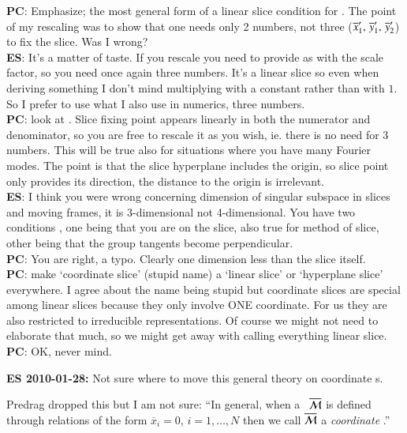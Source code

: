     {\bf PC}: Emphasize; the most general form of a linear slice condition for
    \cLe. The point of my rescaling was to show that one needs only 2 numbers,
    not three (${\overline{x}'_{1}},\,{\overline{y}'_{1}},\,{\overline{y}'_{2}}$)
    to fix the slice. Was I wrong?
    \\
    {\bf ES}: It's a matter of taste. If you rescale
    you need to provide as with the scale factor, so you need once again three numbers.
    It's a linear slice so even when deriving something I don't mind multiplying with
    a constant rather than with $1$. So I prefer to use what I also use in numerics,
    three numbers.
    \\
    {\bf PC}: look at . Slice fixing point
    appears linearly in both the numerator and denominator,
    so you are free to rescale it as you wish, ie. there is
    no need for 3 numbers. This will be true also for situations where
    you have many Fourier modes. The point is that the slice
    hyperplane includes the origin, so slice point only
    provides its direction, the distance to the origin is
    irrelevant.
    \\
    {\bf ES}: I think you were wrong concerning dimension of singular subspace
    in slices and moving frames, it is 3-dimensional not 4-dimensional. You have two
    conditions , one being that you are on the slice, also true
    for method of slice, other being that the group tangents become perpendicular.
    \\
    {\bf PC}: You are right, a typo. Clearly one dimension less than the slice itself.
    \\
    {\bf PC}: make `coordinate slice' (stupid name) a `linear slice' or `hyperplane slice'
    everywhere.  I agree about the name being stupid but coordinate slices are special
    among linear slices because they only involve ONE coordinate. For us they are
    also restricted to irreducible representations.
    Of course we might not need to elaborate that much, so we might get away with
    calling everything linear slice.
        \\
    {\bf PC}: OK, never mind.

{\bf ES 2010-01-28:} Not sure where to move this general theory on coordinate \slice s.

Predrag dropped this but I am not sure: ``In general,
when a \slice\ $\overline{\cal M}$ is defined through relations of the
form $\overline{x}_i=0$, $i=1,\ldots,N$ then we call $\overline{\cal M}$
a \emph{coordinate \slice}.''


